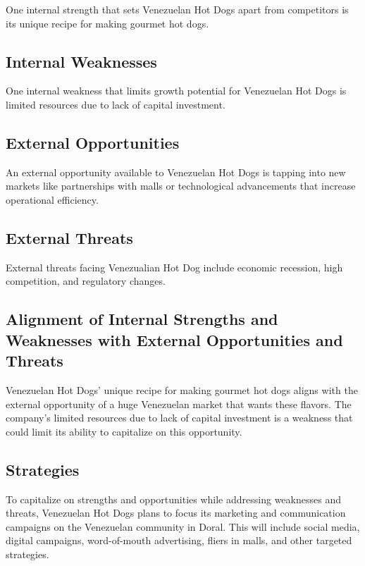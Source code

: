 One internal strength that sets Venezuelan Hot Dogs apart from competitors is its unique recipe for making gourmet hot dogs.

\subsection{Internal Weaknesses}

One internal weakness that limits growth potential for Venezuelan Hot Dogs is limited resources due to lack of capital investment.

\subsection{External Opportunities}

An external opportunity available to Venezuelan Hot Dogs is tapping into new markets like partnerships with malls or technological advancements that increase operational efficiency.

\subsection{External Threats}

External threats facing Venezualian Hot Dog include economic recession, high competition, and regulatory changes.

\subsection{Alignment of Internal Strengths and Weaknesses with External Opportunities and Threats}

Venezuelan Hot Dogs' unique recipe for making gourmet hot dogs aligns with the external opportunity of a huge Venezuelan market that wants these flavors. The company's limited resources due to lack of capital investment is a weakness that could limit its ability to capitalize on this opportunity.

\subsection{Strategies}

To capitalize on strengths and opportunities while addressing weaknesses and threats, Venezuelan Hot Dogs plans to focus its marketing and communication campaigns on the Venezuelan community in Doral. This will include social media, digital campaigns, word-of-mouth advertising, fliers in malls, and other targeted strategies.

